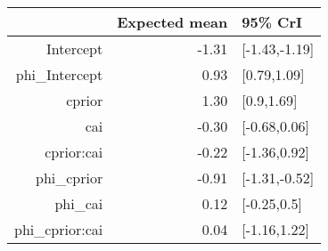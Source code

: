 \begin{tabular}{rrl}
  \hline
 & Expected mean & 95\% CrI \\ 
  \hline
Intercept & -1.31 & [-1.43,-1.19] \\ 
  phi\_Intercept & 0.93 & [0.79,1.09] \\ 
  cprior & 1.30 & [0.9,1.69] \\ 
  cai & -0.30 & [-0.68,0.06] \\ 
  cprior:cai & -0.22 & [-1.36,0.92] \\ 
  phi\_cprior & -0.91 & [-1.31,-0.52] \\ 
  phi\_cai & 0.12 & [-0.25,0.5] \\ 
  phi\_cprior:cai & 0.04 & [-1.16,1.22] \\ 
   \hline
\end{tabular}

